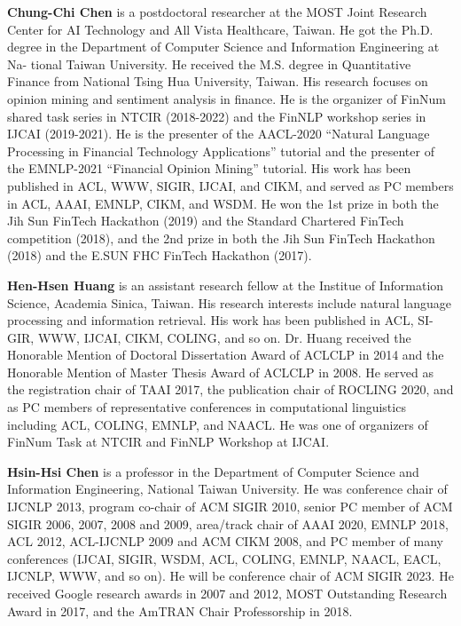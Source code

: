 \begin{bio}
  {\bfseries Chung-Chi Chen} is a postdoctoral researcher at the MOST Joint Research Center for AI Technology and All Vista Healthcare, Taiwan. He got the Ph.D. degree in the Department of Computer Science and Information Engineering at Na- tional Taiwan University. He received the M.S. degree in Quantitative Finance from National Tsing Hua University, Taiwan. His research focuses on opinion mining and sentiment analysis in finance. He is the organizer of FinNum shared task series in NTCIR (2018-2022) and the FinNLP workshop series in IJCAI (2019-2021). He is the presenter of the AACL-2020 ``Natural Language Processing in Financial Technology Applications''  tutorial and the presenter of the EMNLP-2021 ``Financial Opinion Mining'' tutorial. His work has been published in ACL, WWW, SIGIR, IJCAI, and CIKM, and served as PC members in ACL, AAAI, EMNLP, CIKM, and WSDM. He won the 1st prize in both the Jih Sun FinTech Hackathon (2019) and the Standard Chartered FinTech competition (2018), and the 2nd prize in both the Jih Sun FinTech Hackathon (2018) and the E.SUN FHC FinTech Hackathon (2017).

  {\bfseries Hen-Hsen Huang} is an assistant research fellow at the Institue of Information Science, Academia Sinica, Taiwan. His research interests include natural language processing and information retrieval. His work has been published in ACL, SI- GIR, WWW, IJCAI, CIKM, COLING, and so on. Dr. Huang received the Honorable Mention of Doctoral Dissertation Award of ACLCLP in 2014 and the Honorable Mention of Master Thesis Award of ACLCLP in 2008. He served as the registration chair of TAAI 2017, the publication chair of ROCLING 2020, and as PC members of representative conferences in computational linguistics including ACL, COLING, EMNLP, and NAACL. He was one of organizers of FinNum Task at NTCIR and FinNLP Workshop at IJCAI.

  {\bfseries Hsin-Hsi Chen} is a professor in the Department of Computer Science and Information Engineering, National Taiwan University. He was conference chair of IJCNLP 2013, program co-chair of ACM SIGIR 2010, senior PC member of ACM SIGIR 2006, 2007, 2008 and 2009, area/track chair of AAAI 2020, EMNLP 2018, ACL 2012, ACL-IJCNLP 2009 and ACM CIKM 2008, and PC member of many conferences (IJCAI, SIGIR, WSDM, ACL, COLING, EMNLP, NAACL, EACL, IJCNLP, WWW, and so on). He will be conference chair of ACM SIGIR 2023. He received Google research awards in 2007 and 2012, MOST Outstanding Research Award in 2017, and the AmTRAN Chair Professorship in 2018.

\end{bio}

